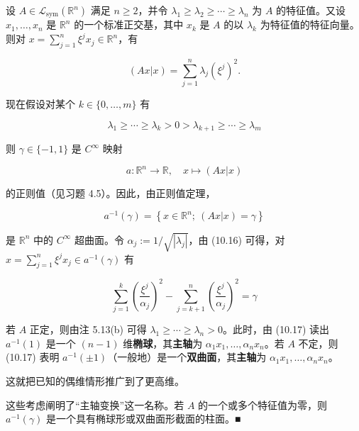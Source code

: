 \begin{remark}

设 $ A \in \mathcal{L}_{\mathrm{sym}}(\mathbb{R}^{n}) $ 满足 $ n \ge 2 $，并令 $ \lambda_{1} \ge \lambda_{2} \ge \cdots \ge \lambda_{n} $ 为 $ A $ 的特征值。又设 $ x_{1}, \ldots, x_{n} $ 是 $ \mathbb{R}^{n} $ 的一个标准正交基，其中 $ x_{k} $ 是 $ A $ 的以 $ \lambda_{k} $ 为特征值的特征向量。则对 $ x = \sum_{j=1}^{n}\xi^{j}x_{j} \in \mathbb{R}^{n} $，有

\begin{equation}
(Ax|x) = \sum_{j=1}^{n}\lambda_{j}(\xi^{j})^{2} .\tag{10.16}
\end{equation}

现在假设对某个 $ k \in \{0, \ldots, m\} $ 有

\[
\lambda_{1} \ge \cdots \ge \lambda_{k} > 0 > \lambda_{k+1} \ge \cdots \ge \lambda_{m}
\]

则 $ \gamma \in \{-1,1\} $ 是 $ C^{\infty} $ 映射

\[
a : \mathbb{R}^{n} \to \mathbb{R} , \quad x \mapsto (Ax|x)
\]

的正则值（见习题 4.5）。因此，由正则值定理，

\[
a^{-1}(\gamma) = \left\{ x \in \mathbb{R}^{n} ;\ (Ax|x) = \gamma \right\}
\]

是 $ \mathbb{R}^{n} $ 中的 $ C^{\infty} $ 超曲面。令 $ \alpha_{j} := 1/\sqrt{|\lambda_{j}|} $，由 (10.16) 可得，对 $ x = \sum_{j=1}^{n}\xi^{j}x_{j} \in a^{-1}(\gamma) $ 有

\begin{equation}
\sum_{j=1}^{k}\left(\frac{\xi^{j}}{\alpha_{j}}\right)^{2} - \sum_{j=k+1}^{n}\left(\frac{\xi^{j}}{\alpha_{j}}\right)^{2} = \gamma\tag{10.17}
\end{equation}

若 $ A $ 正定，则由注 5.13(b) 可得 $ \lambda_{1} \ge \cdots \ge \lambda_{n} > 0 $。此时，由 (10.17) 读出 $ a^{-1}(1) $ 是一个 $ (n-1) $ 维\textbf{椭球}，其\textbf{主轴}为 $ \alpha_{1}x_{1}, \ldots, \alpha_{n}x_{n} $。若 $ A $ 不定，则 (10.17) 表明 $ a^{-1}(\pm 1) $（一般地）是一个\textbf{双曲面}，其\textbf{主轴}为 $ \alpha_{1}x_{1}, \ldots, \alpha_{n}x_{n} $。


这就把已知的偶维情形推广到了更高维。


这些考虑阐明了“主轴变换”这一名称。若 $ A $ 的一个或多个特征值为零，则 $ a^{-1}(\gamma) $ 是一个具有椭球形或双曲面形截面的柱面。\nobreak\hspace{0.35em}■

\end{remark}

